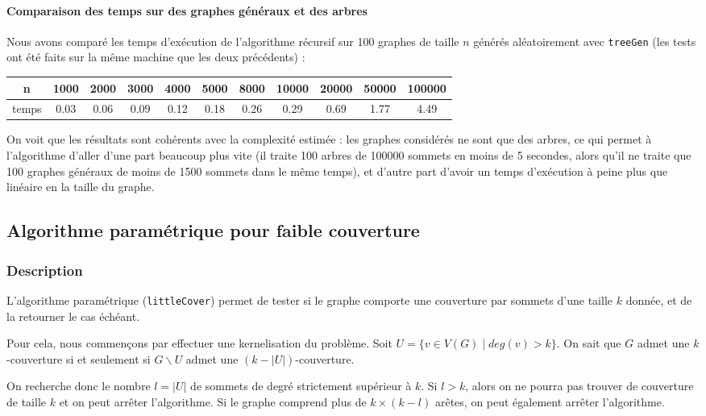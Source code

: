\documentclass[a4paper,10pt]{article}
\begin{document}
\paragraph{Comparaison des temps sur des graphes généraux et des arbres}

Nous avons comparé les temps d'exécution de l'algorithme récursif sur 100 graphes de taille $n$ générés aléatoirement avec \texttt{treeGen} (les tests ont été faits sur la même machine que les deux précédents) :
\begin{center}
\begin{tabular}{|c|c|c|c|c|c|c|c|c|c|c|}
	\hline 
	n & 1000 & 2000 & 3000 & 4000 & 5000 & 8000 & 10000 & 20000 & 50000 & 100000 \\
	\hline
	temps & 0.03 & 0.06 & 0.09 & 0.12 & 0.18 & 0.26 & 0.29 & 0.69 & 1.77 & 4.49\\
	\hline
\end{tabular}
\end{center}

On voit que les résultats sont cohérents avec la complexité estimée : les graphes considérés ne sont que des arbres, ce qui permet à l'algorithme d'aller d'une part beaucoup plus vite (il traite 100 arbres de 100000 sommets en moins de 5 secondes, alors qu'il ne traite que 100 graphes généraux de moins de 1500 sommets dans le même temps), et d'autre part d'avoir un temps d'exécution à peine plus que linéaire en la taille du graphe.

\subsection{Algorithme paramétrique pour faible couverture}

\subsubsection{Description}

L'algorithme paramétrique (\texttt{littleCover}) permet de tester si le graphe comporte une couverture par sommets d'une taille $k$ donnée, et de la retourner le cas échéant.

\bigskip
Pour cela, nous commençons par effectuer une kernelisation du problème. Soit $U = \{ v \in V(G) \mid deg(v) > k\}$. On sait que $G$ admet une $k$-couverture si et seulement si $G \smallsetminus U$ admet une $(k - |U|)$-couverture.

On recherche donc le nombre $l = |U|$ de sommets de degré strictement supérieur à $k$. 
Si $l > k$, alors on ne pourra pas trouver de couverture de taille $k$ et on peut arrêter l'algorithme.
Si le graphe comprend plus de $k\times(k-l)$ arêtes, on peut également arrêter l'algorithme.
\end{document}
